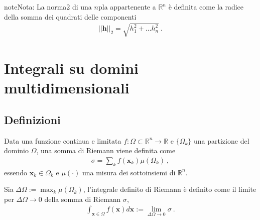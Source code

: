 \documentclass[letterpaper,10pt,italian]{jupyterBook}
\begin{document}
\begin{sphinxadmonition}{note}{Nota:}
\sphinxAtStartPar
{}
La norma\sphinxhyphen{}2 di una \(n\)\sphinxhyphen{}pla appartenente a \(\mathbb{R}^n\) è definita come la radice della somma dei quadrati delle componenti
\begin{equation*}
\begin{split}||\mathbf{h}||_{2} = \sqrt{h_1^2 + \dots h_n^2} \ .\end{split}
\end{equation*}\end{sphinxadmonition}

\sphinxstepscope


\section{Integrali su domini multi\sphinxhyphen{}dimensionali}
\label{\detokenize{ch/multivariable-calculus/integrals:integrali-su-domini-multi-dimensionali}}\label{\detokenize{ch/multivariable-calculus/integrals:multivariable-calculus-integrals}}\label{\detokenize{ch/multivariable-calculus/integrals::doc}}

\subsection{Definizioni}
\label{\detokenize{ch/multivariable-calculus/integrals:definizioni}}
\sphinxAtStartPar
{} Data una funzione continua e limitata \(f: \Omega \subset \mathbb{R}^n \rightarrow \mathbb{R}\) e \(\{ \Omega_k \}\) una partizione del dominio \(\Omega\), una somma di Riemann viene definita come
\begin{equation*}
\begin{split}\sigma = \sum_{k} f(\mathbf{x}_k) \mu(\Omega_k) \ ,\end{split}
\end{equation*}
\sphinxAtStartPar
essendo \(\mathbf{x}_k \in \Omega_k\) e \(\mu(\cdot)\) una misura dei sottoinsiemi di \(\mathbb{R}^n\).

\sphinxAtStartPar
{} Sia \(\Delta \Omega := \max_k \mu(\Omega_k)\), l’integrale definito di Riemann è definito come il limite per \(\Delta \Omega \rightarrow 0\) della somma di Riemann \(\sigma\),
\begin{equation*}
\begin{split}\int_{\mathbf{x} \in \Omega} f(\mathbf{x}) d \mathbf{x} := \lim_{\Delta \Omega \rightarrow 0} \sigma \ .\end{split}
\end{equation*}
\end{document}
